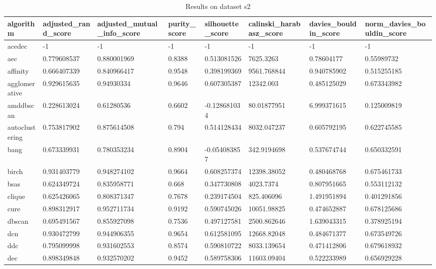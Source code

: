 \begin{table}[H]
\centering
\caption{Results on dataset s2}
\label{tab:params:s2}
\begin{tabular}{|l|l|l|l|l|l|l|l|}
\hline
algorithm & adjusted\_rand\_score & adjusted\_mutual\_info\_score & purity\_score & silhouette\_score & calinski\_harabasz\_score & davies\_bouldin\_score & norm\_davies\_bouldin\_score \\
\hline
acedec & -1 & -1 & -1 & -1 & -1 & -1 & -1 \\
\hline
aec & 0.779608537 & 0.880001969 & 0.8388 & 0.513081526 & 7625.3263 & 0.78604177 & 0.55989732 \\
\hline
affinity & 0.666407339 & 0.840966417 & 0.9548 & 0.398199369 & 9561.768844 & 0.940785902 & 0.515255185 \\
\hline
agglomerative & 0.929615635 & 0.94930334 & 0.9646 & 0.607305387 & 12342.003 & 0.485125029 & 0.673343982 \\
\hline
amddbscan & 0.228613024 & 0.61280536 & 0.6602 & -0.128681034 & 80.01877951 & 6.999371615 & 0.125009819 \\
\hline
autoclustering & 0.753817902 & 0.875614508 & 0.794 & 0.514128434 & 8032.047237 & 0.605792195 & 0.622745585 \\
\hline
bang & 0.673339931 & 0.780353234 & 0.8904 & -0.054083857 & 342.9194698 & 0.537674744 & 0.650332591 \\
\hline
birch & 0.931403779 & 0.948274102 & 0.9664 & 0.608257374 & 12398.38052 & 0.480468768 & 0.675461733 \\
\hline
bsas & 0.624349724 & 0.835958771 & 0.668 & 0.347730808 & 4023.7374 & 0.807951665 & 0.553112132 \\
\hline
clique & 0.625426065 & 0.808371347 & 0.7678 & 0.239174504 & 825.406096 & 1.491951894 & 0.401291856 \\
\hline
cure & 0.898312917 & 0.952711734 & 0.9192 & 0.590745026 & 10051.98825 & 0.474652887 & 0.678125686 \\
\hline
dbscan & 0.695491567 & 0.855927098 & 0.7536 & 0.497127581 & 2500.862646 & 1.639043315 & 0.378925194 \\
\hline
dcn & 0.930472799 & 0.944906355 & 0.9654 & 0.612581095 & 12668.82048 & 0.484671377 & 0.673549726 \\
\hline
ddc & 0.795099998 & 0.931602553 & 0.8574 & 0.590810722 & 8033.139654 & 0.471412806 & 0.679618932 \\
\hline
dec & 0.898349848 & 0.932570202 & 0.9452 & 0.589758306 & 11603.09404 & 0.522233989 & 0.656929228 \\

\end{tabular}
\end{table}
